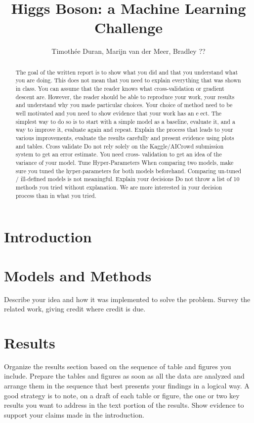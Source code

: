 \documentclass[10pt,conference,compsocconf]{IEEEtran}
\begin{document}
\title{Higgs Boson: a Machine Learning Challenge}

\author{
  Timothée Duran, Marijn van der Meer, Bradley ?? 
}

\maketitle

\begin{abstract}

 The goal of the written report is to show what you did and that you understand what you are doing. This does
not mean that you need to explain everything that was shown in class. You can assume that the reader knows
what cross-validation or gradient descent are. However, the reader should be able to reproduce your work, your
results and understand why you made particular choices. Your choice of method need to be well motivated and
you need to show evidence that your work has an eect.
The simplest way to do so is to start with a simple model as a baseline, evaluate it, and a way to improve it,
evaluate again and repeat. Explain the process that leads to your various improvements, evaluate the results
carefully and present evidence using plots and tables.
Cross validate
Do not rely solely on the Kaggle/AICrowd submission system to get an error estimate. You need cross-
validation to get an idea of the variance of your model.
Tune Hyper-Parameters
When comparing two models, make sure you tuned the hyper-parameters for both models beforehand.
Comparing un-tuned / ill-defined models is not meaningful.
Explain your decisions
Do not throw a list of 10 methods you tried without explanation. We are more interested in your decision
process than in what you tried.
\end{abstract}

\section{Introduction}\label{sec: introduction}

\section{Models and Methods}\label{sec: models_methods}
Describe your idea and how it was implemented to solve
  the problem. Survey the related work, giving credit where credit is
  due.
\section{Results}\label{sec: results}
Organize the results section based on the sequence of table and
figures you include. Prepare the tables and figures as soon as all
the data are analyzed and arrange them in the sequence that best
presents your findings in a logical way. A good strategy is to note,
on a draft of each table or figure, the one or two key results you
want to address in the text portion of the results.
Show evidence to support your claims made in the
  introduction.
\end{document}
